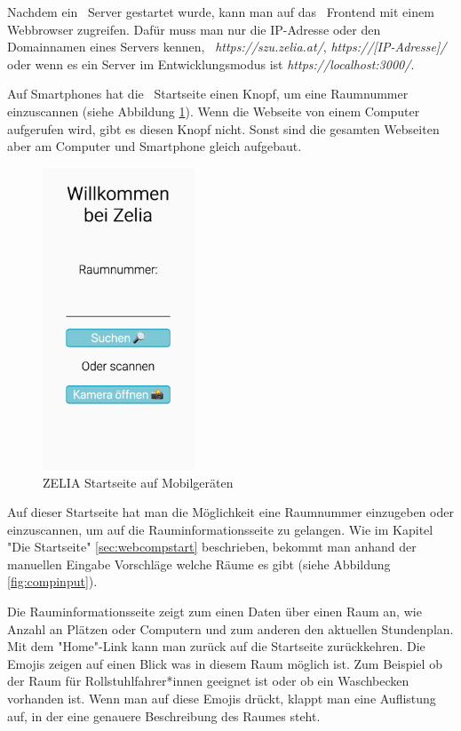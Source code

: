 Nachdem ein \ZELIA\ Server gestartet wurde, kann man auf das \ZELIA\ Frontend mit einem Webbrowser zugreifen. Dafür muss man nur die IP-Adresse oder den Domainnamen eines Servers kennen, \zb\ \emph{https://szu.zelia.at/}, \emph{https://[IP-Adresse]/} oder wenn es ein Server im Entwicklungsmodus ist \emph{https://localhost:3000/}.

Auf Smartphones hat die \ZELIA\ Startseite einen Knopf, um eine Raumnummer einzuscannen (siehe Abbildung \ref{fig:zeliastart}). Wenn die Webseite von einem Computer aufgerufen wird, gibt es diesen Knopf nicht. Sonst sind die gesamten Webseiten aber am Computer und Smartphone gleich aufgebaut.

\begin{figure}[H]
    \centering
    \includegraphics[height=90mm]{media/Handbuch/zelia_start.png}
    \caption{ZELIA Startseite auf Mobilgeräten}
    \label{fig:zeliastart}
\end{figure}

Auf dieser Startseite hat man die Möglichkeit eine Raumnummer einzugeben oder einzuscannen, um auf die Rauminformationsseite zu gelangen. Wie im Kapitel "Die Startseite" \ref{sec:webcompstart} beschrieben, bekommt man anhand der manuellen Eingabe Vorschläge welche Räume es gibt (siehe Abbildung \ref{fig:compinput}). 

Die Rauminformationsseite zeigt zum einen Daten über einen Raum an, wie Anzahl an Plätzen oder Computern und zum anderen den aktuellen Stundenplan. Mit dem "Home"-Link kann man zurück auf die Startseite zurückkehren. Die Emojis zeigen auf einen Blick was in diesem Raum möglich ist. Zum Beispiel ob der Raum für Rollstuhlfahrer*innen geeignet ist oder ob ein Waschbecken vorhanden ist. Wenn man auf diese Emojis drückt, klappt man eine Auflistung auf, in der eine genauere Beschreibung des Raumes steht.


